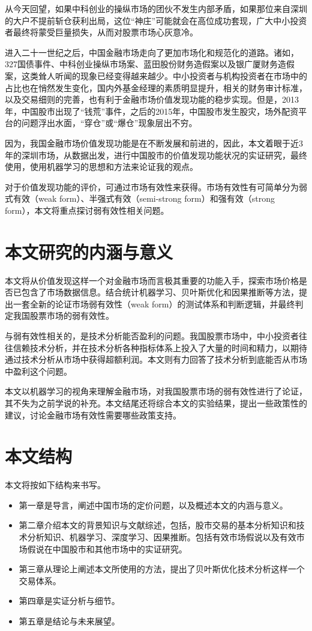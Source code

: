 \documentclass[twoside,longtitle]{LZUthesis}
\begin{document}
从今天回望，如果中科创业的操纵市场的团伙不发生内部矛盾，如果那位来自深圳的大户不提前斩仓获利出局，这位“神庄”可能就会在高位成功套现，广大中小投资者最终将蒙受巨量损失，从而对股票市场心灰意冷。

进入二十一世纪之后，中国金融市场走向了更加市场化和规范化的道路。诸如，327国债事件、中科创业操纵市场案、蓝田股份财务造假案以及银广厦财务造假案，这类耸人听闻的现象已经变得越来越少。中小投资者与机构投资者在市场中的占比也在悄然发生变化，国内外基金经理的素质明显提升，相关的财务审计标准，以及交易细则的完善，也有利于金融市场价值发现功能的稳步实现。但是，2013年，中国股市出现了“钱荒”事件，之后的2015年，中国股市发生股灾，场外配资平台的问题浮出水面，“穿仓”或“爆仓”现象层出不穷。

因为，我国金融市场价值发现功能是在不断发展和前进的，因此，本文着眼于近3年的深圳市场，从数据出发，进行中国股市的价值发现功能状况的实证研究，最终使用，使用机器学习的思想和方法来论证我的观点。

对于价值发现功能的评价，可通过市场有效性\cite{Malkiel1970EFFICIENT}来获得。市场有效性有可简单分为弱式有效（weak form）、半强式有效（semi-strong form）和强有效（strong form），本文将重点探讨弱有效性相关问题。

\section{本文研究的内涵与意义}

本文将从价值发现这样一个对金融市场而言极其重要的功能入手，探索市场价格是否已包含了市场数据信息。结合统计机器学习、贝叶斯优化和因果推断等方法，提出一套全新的论证市场弱有效性（weak form）的测试体系和判断逻辑，并最终判定我国股票市场的弱有效性。

与弱有效性相关的，是技术分析能否盈利的问题。我国股票市场中，中小投资者往往信赖技术分析，并在技术分析各种指标体系上投入了大量的时间和精力，以期待通过技术分析从市场中获得超额利润。本文则有力回答了技术分析到底能否从市场中盈利这个问题。

本文以机器学习的视角来理解金融市场，对我国股票市场的弱有效性进行了论证，其不失为之前学说的补充。本文结尾还将综合本文的实验结果，提出一些政策性的建议，讨论金融市场有效性需要哪些政策支持。

\section{本文结构}
本文将按如下结构来书写。
\begin{itemize}
    \item 第一章是导言，阐述中国市场的定价问题，以及概述本文的内涵与意义。
    \item 第二章介绍本文的背景知识与文献综述，包括，股市交易的基本分析知识和技术分析知识、机器学习、深度学习、因果推断。包括有效市场假说以及有效市场假说在中国股市和其他市场中的实证研究。
    \item 第三章从理论上阐述本文所使用的方法，提出了贝叶斯优化技术分析这样一个交易体系。
    \item 第四章是实证分析与细节。
    \item 第五章是结论与未来展望。
\end{itemize}
\end{document}
